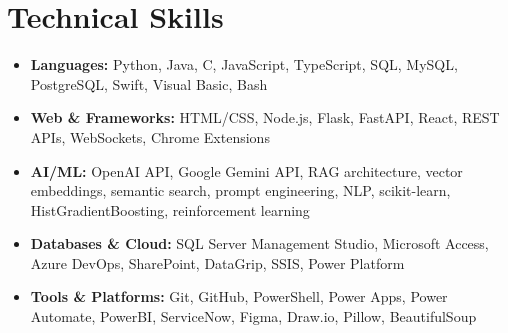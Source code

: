\documentclass[10pt,letterpaper]{article}
\begin{document}
\section{Technical Skills}
\begin{itemize}[leftmargin=0in, label={}]
  \item {\small \textbf{Languages:} Python, Java, C, JavaScript, TypeScript, SQL, MySQL, PostgreSQL, Swift, Visual Basic, Bash}
  \item {\small \textbf{Web \& Frameworks:} HTML/CSS, Node.js, Flask, FastAPI, React, REST APIs, WebSockets, Chrome Extensions}
  \item {\small \textbf{AI/ML:} OpenAI API, Google Gemini API, RAG architecture, vector embeddings, semantic search, prompt engineering, NLP, scikit-learn, HistGradientBoosting, reinforcement learning}
  \item {\small \textbf{Databases \& Cloud:} SQL Server Management Studio, Microsoft Access, Azure DevOps, SharePoint, DataGrip, SSIS, Power Platform}
  \item {\small \textbf{Tools \& Platforms:} Git, GitHub, PowerShell, Power Apps, Power Automate, PowerBI, ServiceNow, Figma, Draw.io, Pillow, BeautifulSoup}
\end{itemize}

\end{document}
